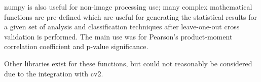 numpy is also useful for non-image processing use; many complex mathematical functions are 
pre-defined which are useful for generating the statistical results for a given set of analysis
and classification techniques after leave-one-out cross validation is performed. The main use was
for Pearson's product-moment correlation coefficient and p-value significance.

Other libraries exist for these functions, but could not reasonably be considered due to the 
integration with \gls{cv2}.
